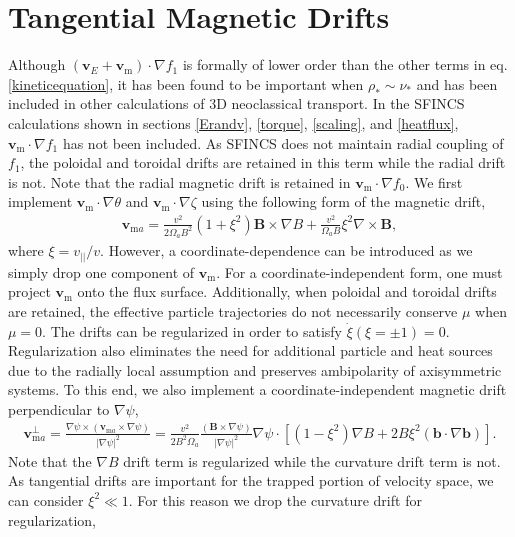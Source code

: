 \documentclass[aip, pop, preprint]{revtex4-1}
\numberwithin{figure}{section}
\numberwithin{equation}{section}
\begin{document}
\section{Tangential Magnetic Drifts}\label{mds}
Although $(\bm{v}_E + \bm{v}_{\text{m}}) \cdot \nabla f_1$ is formally of lower order than the other terms in eq. \ref{kineticequation}, it has been found to be important when $\rho_* \sim \nu_*$ \cite{Calvo2016, Matsuoka2015} and has been included in other calculations of 3D neoclassical transport. In the SFINCS calculations shown in sections \ref{Erandv}, \ref{torque}, \ref{scaling}, and \ref{heatflux}, $\bm{v}_{\text{m}} \cdot \nabla f_1$ has not been included. As SFINCS does not maintain radial coupling of $f_1$, the poloidal and toroidal drifts are retained in this term while the radial drift is not. Note that the radial magnetic drift is retained in $\bm{v}_{\text{m}} \cdot \nabla f_0$. We first implement $\bm{v}_{\text{m}} \cdot \nabla \theta$ and $\bm{v}_{\text{m}}  \cdot \nabla \zeta$ using the following form of the magnetic drift,
\begin{gather}
\bm{v}_{\text{m} a} = \frac{v^2}{2 \Omega_a B^2} (1 + \xi^2) \bm{B} \times \nabla B + \frac{v^2}{\Omega_a B} \xi^2 \nabla \times \bm{B},
\label{eq:mds1}
\end{gather}
where $\xi = v_{||}/v$. However, a coordinate-dependence can be introduced as we simply drop one component of $\bm{v}_{\text{m}}$. For a coordinate-independent form, one must project $\bm{v}_{\text{m}}$ onto the flux surface. Additionally, when poloidal and toroidal drifts are retained, the effective particle trajectories do not necessarily conserve $\mu$ when $\mu = 0$. The drifts can be regularized in order to satisfy $\dot{\xi} (\xi = \pm 1) = 0$. Regularization also eliminates the need for additional particle and heat sources due to the radially local assumption and preserves ambipolarity of axisymmetric systems.\cite{Sugama2016} To this end, we also implement a coordinate-independent magnetic drift perpendicular to $\nabla \psi$,
\begin{gather}
\bm{v}_{\text{m}a}^{\perp} = \frac{\nabla \psi \times (\bm{v}_{\text{m}a} \times \nabla \psi)}{\rvert \nabla \psi \rvert^2}= \frac{v^2}{2B^2 \Omega_a} \frac{(\bm{B} \times \nabla \psi)}{\rvert \nabla \psi \rvert^2} \nabla \psi \cdot\left[(1-\xi^2)\nabla B + 2B\xi^2 (\bm{b} \cdot \nabla \bm{b}) \right].
\end{gather}
Note that the $\nabla B$ drift term is regularized while the curvature drift term is not. As tangential drifts are important for the trapped portion of velocity space, we can consider $\xi^2 \ll 1$. For this reason we drop the curvature drift for regularization,
\end{document}
